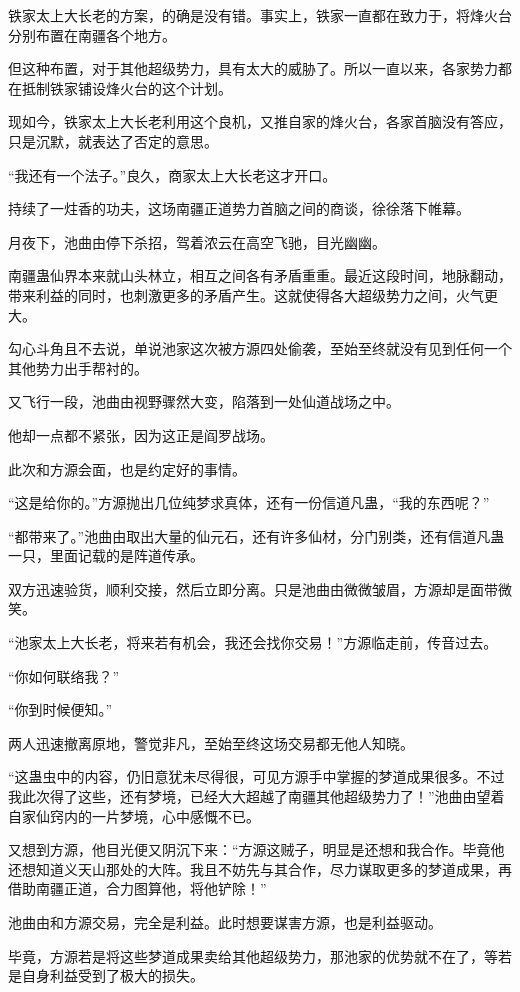 \begin{this_body}
铁家太上大长老的方案，的确是没有错。事实上，铁家一直都在致力于，将烽火台分别布置在南疆各个地方。

但这种布置，对于其他超级势力，具有太大的威胁了。所以一直以来，各家势力都在抵制铁家铺设烽火台的这个计划。

现如今，铁家太上大长老利用这个良机，又推自家的烽火台，各家首脑没有答应，只是沉默，就表达了否定的意思。

“我还有一个法子。”良久，商家太上大长老这才开口。

持续了一炷香的功夫，这场南疆正道势力首脑之间的商谈，徐徐落下帷幕。

月夜下，池曲由停下杀招，驾着浓云在高空飞驰，目光幽幽。

南疆蛊仙界本来就山头林立，相互之间各有矛盾重重。最近这段时间，地脉翻动，带来利益的同时，也刺激更多的矛盾产生。这就使得各大超级势力之间，火气更大。

勾心斗角且不去说，单说池家这次被方源四处偷袭，至始至终就没有见到任何一个其他势力出手帮衬的。

又飞行一段，池曲由视野骤然大变，陷落到一处仙道战场之中。

他却一点都不紧张，因为这正是阎罗战场。

此次和方源会面，也是约定好的事情。

“这是给你的。”方源抛出几位纯梦求真体，还有一份信道凡蛊，“我的东西呢？”

“都带来了。”池曲由取出大量的仙元石，还有许多仙材，分门别类，还有信道凡蛊一只，里面记载的是阵道传承。

双方迅速验货，顺利交接，然后立即分离。只是池曲由微微皱眉，方源却是面带微笑。

“池家太上大长老，将来若有机会，我还会找你交易！”方源临走前，传音过去。

“你如何联络我？”

“你到时候便知。”

两人迅速撤离原地，警觉非凡，至始至终这场交易都无他人知晓。

“这蛊虫中的内容，仍旧意犹未尽得很，可见方源手中掌握的梦道成果很多。不过我此次得了这些，还有梦境，已经大大超越了南疆其他超级势力了！”池曲由望着自家仙窍内的一片梦境，心中感慨不已。

又想到方源，他目光便又阴沉下来：“方源这贼子，明显是还想和我合作。毕竟他还想知道义天山那处的大阵。我且不妨先与其合作，尽力谋取更多的梦道成果，再借助南疆正道，合力图算他，将他铲除！”

池曲由和方源交易，完全是利益。此时想要谋害方源，也是利益驱动。

毕竟，方源若是将这些梦道成果卖给其他超级势力，那池家的优势就不在了，等若是自身利益受到了极大的损失。


\end{this_body}
